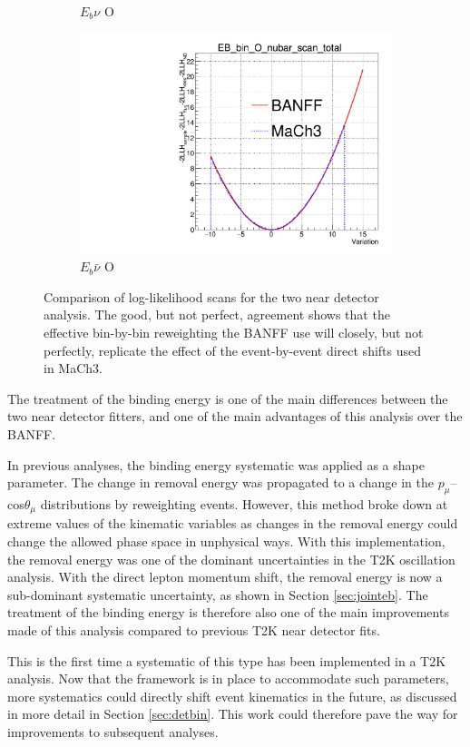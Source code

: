 \begin{figure}
\begin{subfigure}{.48\textwidth}
  \caption{$E_{b}\nu$ O}
\end{subfigure}
\begin{subfigure}{.48\textwidth}
  \centering
  \includegraphics[width=0.73\linewidth]{figs/EB_dial_O_nubar_full_FullLLH}
  \caption{$E_{b}\bar{\nu}$ O}
\end{subfigure}
\caption{Comparison of log-likelihood scans for the two near detector analysis. The good, but not perfect, agreement shows that the effective bin-by-bin reweighting the BANFF use will closely, but not perfectly, replicate the effect of the event-by-event direct shifts used in MaCh3.}
\label{fig:EbLLHBANFF}
\end{figure}

The treatment of the binding energy is one of the main differences between the two near detector fitters, and one of the main advantages of this analysis over the BANFF. 

In previous analyses, the binding energy systematic was applied as a shape parameter. The change in removal energy was propagated to a change in the $p_{\mu}$--cos$\theta_{\mu}$ distributions by reweighting events. However, this method broke down at extreme values of the kinematic variables as changes in the removal energy could change the allowed phase space in unphysical ways. With this implementation, the removal energy was one of the dominant uncertainties in the T2K oscillation analysis. With the direct lepton momentum shift, the removal energy is now a sub-dominant systematic uncertainty, as shown in Section \ref{sec:jointeb}. The treatment of the binding energy is therefore also one of the main improvements made of this analysis compared to previous T2K near detector fits.

This is the first time a systematic of this type has been implemented in a T2K analysis. Now that the framework is in place to accommodate such parameters, more systematics could directly shift event kinematics in the future, as discussed in more detail in Section \ref{sec:detbin}. This work could therefore pave the way for improvements to subsequent analyses.

